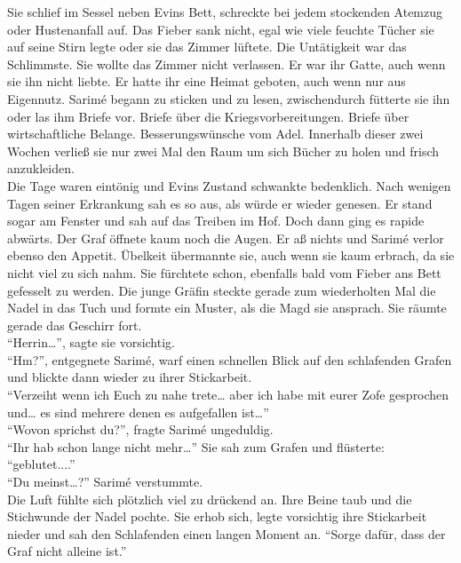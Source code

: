 Sie schlief im Sessel neben Evins Bett, schreckte bei jedem stockenden Atemzug oder Hustenanfall 
auf. Das Fieber sank nicht, egal wie viele feuchte Tücher sie auf seine Stirn legte oder sie das 
Zimmer lüftete. Die Untätigkeit war das Schlimmste. Sie wollte das Zimmer nicht verlassen. Er war 
ihr Gatte, auch wenn sie ihn nicht liebte. Er hatte ihr eine Heimat geboten, auch wenn nur aus 
Eigennutz. Sarimé begann zu sticken und zu lesen, zwischendurch fütterte sie ihn oder las ihm 
Briefe vor. Briefe über die Kriegsvorbereitungen. Briefe über wirtschaftliche Belange. 
Besserungswünsche vom Adel. Innerhalb dieser zwei Wochen verließ sie nur zwei Mal den Raum um sich 
Bücher zu holen und frisch anzukleiden.\\
Die Tage waren eintönig und Evins Zustand schwankte bedenklich. Nach wenigen Tagen seiner 
Erkrankung sah es so aus, als würde er wieder genesen. Er stand sogar am Fenster und sah auf das 
Treiben im Hof. Doch dann ging es rapide abwärts. Der Graf öffnete kaum noch die Augen. Er aß nichts 
und Sarimé verlor ebenso den Appetit. Übelkeit übermannte sie, auch wenn sie kaum erbrach, da sie 
nicht viel zu sich nahm. Sie fürchtete schon, ebenfalls bald vom Fieber ans Bett gefesselt zu 
werden. Die junge Gräfin steckte gerade zum wiederholten Mal die Nadel in das Tuch und formte ein 
Muster, als die Magd sie ansprach. Sie räumte gerade das Geschirr fort. \\
``Herrin…'', sagte sie vorsichtig.\\
``Hm?'', entgegnete Sarimé, warf einen schnellen Blick auf den schlafenden Grafen und blickte dann 
wieder zu ihrer Stickarbeit.\\
``Verzeiht wenn ich Euch zu nahe trete… aber ich habe mit eurer Zofe gesprochen und… es sind 
mehrere denen es aufgefallen ist…''\\
``Wovon sprichst du?'', fragte Sarimé ungeduldig.\\
``Ihr hab schon lange nicht mehr…'' Sie sah zum Grafen und flüsterte: ``geblutet....''\\
``Du meinst…?'' Sarimé verstummte.\\
Die Luft fühlte sich plötzlich viel zu drückend an. Ihre Beine taub und die Stichwunde der Nadel 
pochte. Sie erhob sich, legte vorsichtig ihre Stickarbeit nieder und sah den Schlafenden einen 
langen Moment an. ``Sorge dafür, dass der Graf nicht alleine ist.''\\


